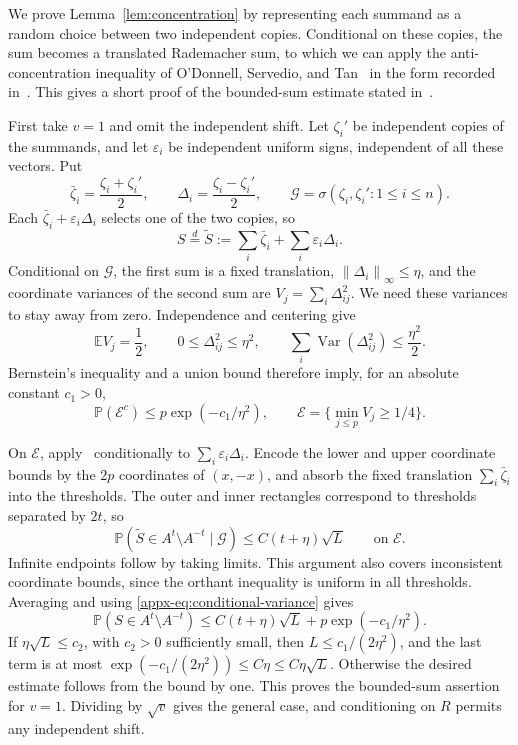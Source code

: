 \documentclass[11pt,letterpaper]{article}
\newif\ifshowrev
\newcommand{\rev}[1]{\ifshowrev{\color{revblue}%
\hypersetup{linkcolor=revblue,citecolor=revblue,urlcolor=revblue}#1}\else#1\fi}
\newcommand{\rs}[1]{\ifshowrev{\color{revblue}#1}\else#1\fi}
\theoremstyle{remark}
\newcommand{\E}{\mathbb E}
\newcommand{\Pp}{\mathbb P}
\newcommand{\Var}{\operatorname{Var}}
\newcommand{\norm}[1]{\left\lVert#1\right\rVert}
\begin{document}
We prove Lemma~\rev{\ref{lem:concentration}} by representing each summand
as a random choice between two independent copies. Conditional on these
copies, the sum becomes a translated Rademacher sum, to which we can
apply the anti-concentration inequality of O'Donnell, Servedio, and
Tan~\cite{OST} in the form recorded in~\cite[Lemma~J.4]{CCKK2022}.
This gives a short proof of the bounded-sum estimate stated
in~\cite[Lemma~2.1]{AL}.

First take \(v=1\) and omit the independent shift. Let
\(\zeta_i'\) be independent copies of the summands, and let
\(\varepsilon_i\) be independent uniform signs, independent of all
these vectors. Put
\[
 \rs{\bar\zeta_i}=\frac{\zeta_i+\zeta_i'}2,\qquad
 \rs{\Delta_i}=\frac{\zeta_i-\zeta_i'}2,\qquad
 \mathcal G=\sigma(\zeta_i,\zeta_i':1\le i\le n).
\]
Each \(\rs{\bar\zeta_i}+\varepsilon_i\rs{\Delta_i}\) selects one of the two copies, so
\begin{equation}
 S\stackrel d=\widetilde S:=\sum_i\rs{\bar\zeta_i}+\sum_i\varepsilon_i\rs{\Delta_i}.
 \label{appx-eq:pair-representation}
\end{equation}
Conditional on \(\mathcal G\), the first sum is a fixed translation,
\(\norm{\rs{\Delta_i}}_\infty\le\eta\), and the coordinate variances of the
second sum are \(V_j=\sum_i\rs\Delta_{ij}^2\). We need these variances to
stay away from zero. Independence and centering give
\[
 \E V_j=\frac12,\qquad
 0\le\rs\Delta_{ij}^2\le\eta^2,\qquad
 \sum_i\Var(\rs\Delta_{ij}^2)\le\frac{\eta^2}{2}.
\]
Bernstein's inequality and a union bound therefore imply, for an
absolute constant \(c_1>0\),
\begin{equation}
 \Pp(\mathcal E^c)\le p\exp(-c_1/\eta^2),
 \qquad \mathcal E=\{\min_{j\le p}V_j\ge1/4\}.
 \label{appx-eq:conditional-variance}
\end{equation}

On \(\mathcal E\), apply~\cite[Lemma~J.4]{CCKK2022} conditionally to
\(\sum_i\varepsilon_i\rs{\Delta_i}\). Encode the lower and upper coordinate
bounds by the \(2p\) coordinates of \((x,-x)\), and absorb the fixed
translation \(\sum_i\rs{\bar\zeta_i}\) into the thresholds. The outer and inner
rectangles correspond to thresholds separated by \(2\rs t\), so
\[
 \Pp(\widetilde S\in A^{\rs t}\setminus A^{-\rs t}\mid\mathcal G)
 \le C(\rs t+\eta)\sqrt L\qquad\text{on }\mathcal E.
\]
Infinite endpoints follow by taking limits. This argument also covers
inconsistent coordinate bounds, since the orthant inequality is uniform
in all thresholds. Averaging and using
\eqref{appx-eq:conditional-variance} gives
\begin{equation}
 \Pp(S\in A^{\rs t}\setminus A^{-\rs t})
 \le C(\rs t+\eta)\sqrt L+p\exp(-c_1/\eta^2).
 \label{appx-eq:concentration-pairs}
\end{equation}
If \(\eta\sqrt L\le\rs{c_2}\), with \(\rs{c_2}>0\) sufficiently small, then
\(L\le c_1/(2\eta^2)\), and the last term is at most
\(\exp(-c_1/(2\eta^2))\le C\eta\le C\eta\sqrt L\).
Otherwise the desired estimate follows from the bound by one.
This proves the bounded-sum assertion for \(v=1\). Dividing by
\(\sqrt v\) gives the general case, and conditioning on \(R\)
permits any independent shift.
\end{document}

